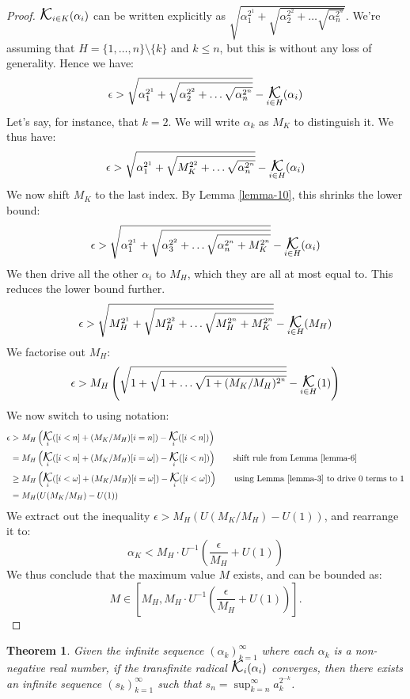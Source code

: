 \documentclass[
]{article}
\DeclareMathOperator*{\kap}{\text{\Large{$\mathcal K$}}}
\theoremstyle{theorem}
\newtheorem{theorem}{Theorem}
\theoremstyle{lemma}
\theoremstyle{corollary}
\theoremstyle{remark}
\theoremstyle{definition}
\begin{document}
\begin{proof}
\(\kap_{i \in K}(\alpha_i)\) can be written explicitly as \(\sqrt{\alpha_1^{2^1} + \sqrt{\alpha_2^{2^2} + \dotsc\sqrt{\alpha_n^{2^n}}}}\). We're assuming that \(H=\{1,\dotsc,n\}\setminus\{k\}\) and \(k \leq n\), but this is without any loss of generality. Hence we have: \[\epsilon > \sqrt{\alpha_1^{2^1} + \sqrt{\alpha_2^{2^2} + \dotsc\sqrt{\alpha_n^{2^n}}}} - \kap_{i \in H}(\alpha_i)\] Let's say, for instance, that \(k = 2\). We will write \(\alpha_k\) as \(M_K\) to distinguish it. We thus have: \[\epsilon > \sqrt{\alpha_1^{2^1} + \sqrt{M_K^{2^2} + \dotsc\sqrt{\alpha_n^{2^n}}}} - \kap_{i \in H}(\alpha_i)\] We now shift \(M_K\) to the last index. By Lemma \ref{lemma-10}, this shrinks the lower bound: \[\epsilon > \sqrt{\alpha_1^{2^1} + \sqrt{\alpha_3^{2^2} + \dotsc\sqrt{\alpha_n^{2^n} + M_K^{2^n}}}} - \kap_{i \in H}(\alpha_i)\] We then drive all the other \(\alpha_i\) to \(M_H\), which they are all at most equal to. This reduces the lower bound further. \[\epsilon > \sqrt{M_H^{2^1} + \sqrt{M_H^{2^2} + \dotsc\sqrt{M_H^{2^n} + M_K^{2^n}}}} - \kap_{i \in H}(M_H)\] We factorise out \(M_H\): \[\epsilon > M_H\left(\sqrt{1 + \sqrt{1 + \dotsc\sqrt{1 + (M_K/M_H)^{2^n}}}} - \kap_{i \in H}(1)\right)\] We now switch to using notation: \[\begin{aligned}
\epsilon &> M_H\left(\kap_i([i < n] + (M_K/M_H)[i=n]) - \kap_i([i < n])\right)\\
&= M_H\left(\kap_i([i < n] + (M_K/M_H)[i=\omega]) - \kap_i([i < n])\right) \qquad{\text{shift rule from Lemma \ref{lemma-6}}}\\
&\geq M_H\left(\kap_i([i < \omega] + (M_K/M_H)[i=\omega]) - \kap_i([i < \omega])\right) \qquad{\text{using Lemma \ref{lemma-3} to drive $0$ terms to $1$}}\\
&=M_H(U(M_K/M_H) - U(1))
\end{aligned}\] We extract out the inequality \(\epsilon > M_H(U(M_K / M_H) - U(1))\), and rearrange it to: \[\alpha_K < M_H \cdot U^{-1}\left(\frac{\epsilon}{M_H} + U(1)\right)\] We thus conclude that the maximum value \(M\) exists, and can be bounded as: \[M \in \left[M_H,M_H \cdot U^{-1}\left(\frac{\epsilon}{M_H} + U(1)\right)\right].\] \end{proof}

\begin{theorem}
\label{theorem-necessity}
Given the infinite sequence \((\alpha_k)_{k=1}^\infty\) where each \(\alpha_k\) is a non-negative real number, if the transfinite radical \(\kap_i(\alpha_i)\) converges, then there exists an infinite sequence \((s_k)_{k=1}^\infty\) such that \(s_n = \sup_{k=n}^\infty a_k^{2^{-k}}\).
\end{theorem}
\end{document}
